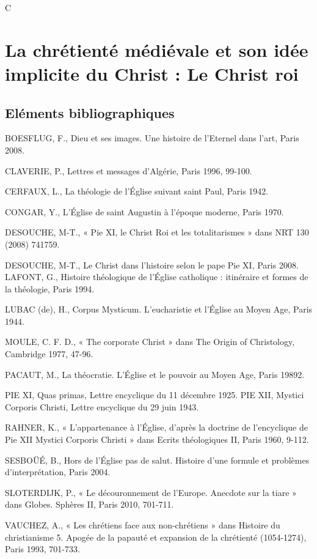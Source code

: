C\chapter{La chrétienté médiévale et son idée implicite du Christ : Le Christ roi} 


\section{Eléments bibliographiques }


BOESFLUG, F., Dieu et ses  images. Une histoire de l’Eternel dans l’art, Paris 2008. 

CLAVERIE, P., Lettres et messages d’Algérie, Paris 1996, 99-100. 

CERFAUX, L., La théologie de l’Église suivant saint Paul, Paris 1942. 

CONGAR, Y., L’Église de saint Augustin à l’époque moderne, Paris 1970. 

DESOUCHE, M-T., « Pie XI, le Christ Roi et les totalitarismes » dans NRT 130 (2008) 741759. 

DESOUCHE, M-T., Le Christ dans l’histoire selon le pape Pie XI, Paris 2008. LAFONT, G., Histoire théologique de l'Église catholique : itinéraire et formes de la théologie, Paris 1994. 

LUBAC (de), H., Corpus Mysticum. L’eucharistie et l’Église au Moyen Age, Paris 1944.  

MOULE, C. F. D., « The corporate Christ » dans The Origin of Christology, Cambridge 1977, 47-96. 

PACAUT, M., La théocratie. L’Église et le pouvoir au Moyen Age, Paris 19892. 

PIE XI, Quas primas, Lettre encyclique du 11 décembre 1925. PIE XII, Mystici Corporis Christi, Lettre encyclique du 29 juin 1943. 

RAHNER, K., « L’appartenance à l’Église, d’après la doctrine de l’encyclique de Pie XII Mystici Corporis Christi » dans Ecrits théologiques II, Paris 1960, 9-112. 

SESBOÜÉ, B., Hors de l’Église pas de salut. Histoire d’une formule et problèmes d’interprétation, Paris 2004. 

SLOTERDIJK, P., « Le découronnement de l’Europe. Anecdote sur la tiare » dans Globes. Sphères II, Paris 2010, 701-711. 

VAUCHEZ, A., « Les chrétiens face aux non-chrétiens » dans Histoire du christianisme 5. Apogée de la papauté et expansion de la chrétienté (1054-1274), Paris 1993, 701-733. 

